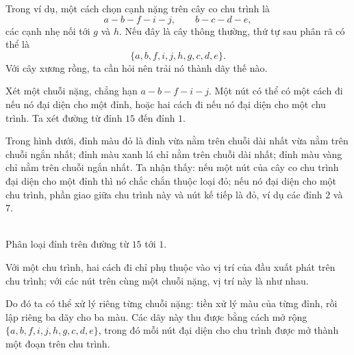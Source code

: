 \documentclass[11pt]{article}
\begin{document}
Trong ví dụ, một cách chọn cạnh nặng trên cây co chu trình là
\[
  a-b-f-i-j,\qquad b-c-d-e,
\]
các cạnh nhẹ nối tới \(g\) và \(h\). Nếu đây là cây thông thường, thứ tự sau
phân rã có thể là
\[
  \{a,b,f,i,j,h,g,c,d,e\}.
\]
Với cây xương rồng, ta cần hỏi nên trải nó thành dãy thế nào.

Xét một chuỗi nặng, chẳng hạn \(a-b-f-i-j\). Một nút có thể có một cách đi
nếu nó đại diện cho một đỉnh, hoặc hai cách đi nếu nó đại diện cho một chu
trình. Ta xét đường từ đỉnh \(15\) đến đỉnh \(1\).

Trong hình dưới, đỉnh màu đỏ là đỉnh vừa nằm trên chuỗi dài nhất vừa nằm trên
chuỗi ngắn nhất; đỉnh màu xanh lá chỉ nằm trên chuỗi dài nhất; đỉnh màu vàng
chỉ nằm trên chuỗi ngắn nhất. Ta nhận thấy: nếu một nút của cây co chu trình
đại diện cho một đỉnh thì nó chắc chắn thuộc loại đỏ; nếu nó đại diện cho một
chu trình, phần giao giữa chu trình này và nút kế tiếp là đỏ, ví dụ các đỉnh
\(2\) và \(7\).

\begin{center}
\\[-0.2em]
{\small Phân loại đỉnh trên đường từ \(15\) tới \(1\).}
\end{center}

Với một chu trình, hai cách đi chỉ phụ thuộc vào vị trí của đầu xuất phát trên
chu trình; với các nút trên cùng một chuỗi nặng, vị trí này là như nhau.

Do đó ta có thể xử lý riêng từng chuỗi nặng: tiền xử lý màu của từng đỉnh, rồi
lập riêng ba dãy cho ba màu. Các dãy này thu được bằng cách mở rộng
\(\{a,b,f,i,j,h,g,c,d,e\}\), trong đó mỗi nút đại diện cho chu trình được mở
thành một đoạn trên chu trình.
\end{document}
